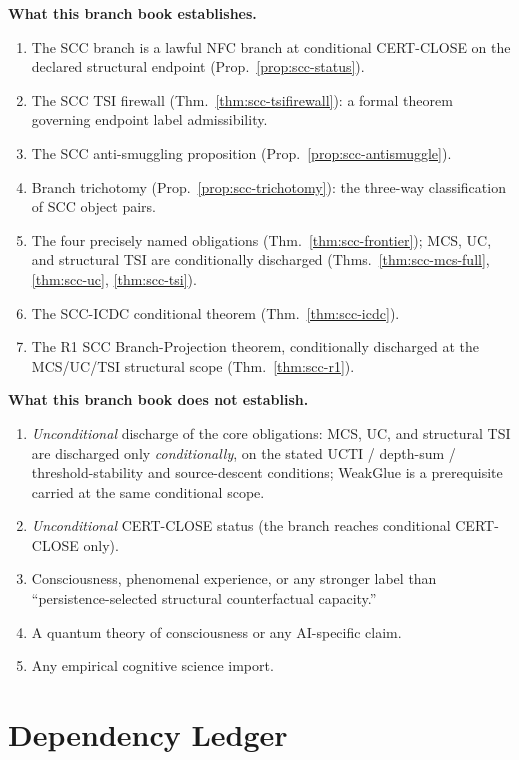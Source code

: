 \documentclass[12pt,oneside]{amsbook}
\theoremstyle{plain}
\theoremstyle{definition}
\theoremstyle{remark}
\begin{document}
\textbf{What this branch book establishes.}
\begin{enumerate}
 \item The SCC branch is a lawful NFC branch at conditional CERT-CLOSE
 on the declared structural endpoint (Prop.~\ref{prop:scc-status}).
 \item The SCC TSI firewall (Thm.~\ref{thm:scc-tsifirewall}):
 a formal theorem governing endpoint label admissibility.
 \item The SCC anti-smuggling proposition
 (Prop.~\ref{prop:scc-antismuggle}).
 \item Branch trichotomy (Prop.~\ref{prop:scc-trichotomy}):
 the three-way classification of SCC object pairs.
 \item The four precisely named obligations
 (Thm.~\ref{thm:scc-frontier}); MCS, UC, and structural TSI are
 conditionally discharged (Thms.~\ref{thm:scc-mcs-full},
 \ref{thm:scc-uc}, \ref{thm:scc-tsi}).
 \item The SCC-ICDC conditional theorem
 (Thm.~\ref{thm:scc-icdc}).
 \item The R1 SCC Branch-Projection theorem, conditionally discharged
 at the MCS/UC/TSI structural scope (Thm.~\ref{thm:scc-r1}).
\end{enumerate}

\textbf{What this branch book does not establish.}
\begin{enumerate}
 \item \emph{Unconditional} discharge of the core obligations: MCS, UC,
 and structural TSI are discharged only \emph{conditionally}, on the
 stated UCTI / depth-sum / threshold-stability and source-descent
 conditions; WeakGlue is a prerequisite carried at the same conditional
 scope.
 \item \emph{Unconditional} CERT-CLOSE status (the branch reaches
 conditional CERT-CLOSE only).
 \item Consciousness, phenomenal experience, or any stronger
 label than ``persistence-selected structural counterfactual
 capacity.''
 \item A quantum theory of consciousness or any AI-specific claim.
 \item Any empirical cognitive science import.
\end{enumerate}

\section{Dependency Ledger}
\end{document}
